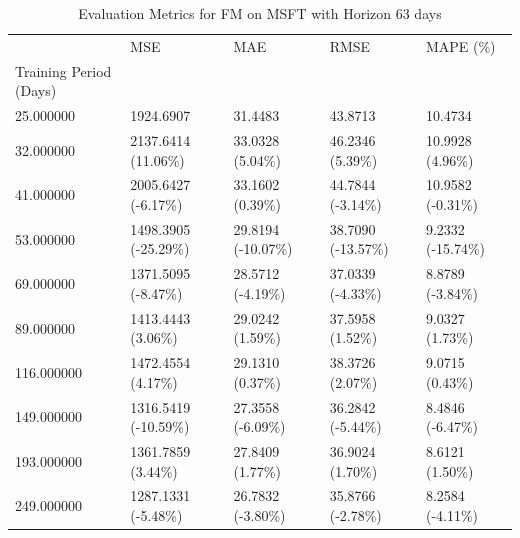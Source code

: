 \begin{table}
\caption{Evaluation Metrics for FM on MSFT with Horizon 63 days}
\label{tab:fm_MSFT_h63_metrics}
\begin{tabular}{lllll}
\toprule
 & MSE & MAE & RMSE & MAPE (\%) \\
Training Period (Days) &  &  &  &  \\
\midrule
25.000000 & 1924.6907 & 31.4483 & 43.8713 & 10.4734 \\
32.000000 & 2137.6414 (11.06\%) & 33.0328 (5.04\%) & 46.2346 (5.39\%) & 10.9928 (4.96\%) \\
41.000000 & 2005.6427 (-6.17\%) & 33.1602 (0.39\%) & 44.7844 (-3.14\%) & 10.9582 (-0.31\%) \\
53.000000 & 1498.3905 (-25.29\%) & 29.8194 (-10.07\%) & 38.7090 (-13.57\%) & 9.2332 (-15.74\%) \\
69.000000 & 1371.5095 (-8.47\%) & 28.5712 (-4.19\%) & 37.0339 (-4.33\%) & 8.8789 (-3.84\%) \\
89.000000 & 1413.4443 (3.06\%) & 29.0242 (1.59\%) & 37.5958 (1.52\%) & 9.0327 (1.73\%) \\
116.000000 & 1472.4554 (4.17\%) & 29.1310 (0.37\%) & 38.3726 (2.07\%) & 9.0715 (0.43\%) \\
149.000000 & 1316.5419 (-10.59\%) & 27.3558 (-6.09\%) & 36.2842 (-5.44\%) & 8.4846 (-6.47\%) \\
193.000000 & 1361.7859 (3.44\%) & 27.8409 (1.77\%) & 36.9024 (1.70\%) & 8.6121 (1.50\%) \\
249.000000 & 1287.1331 (-5.48\%) & 26.7832 (-3.80\%) & 35.8766 (-2.78\%) & 8.2584 (-4.11\%) \\
\bottomrule
\end{tabular}
\end{table}
